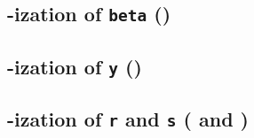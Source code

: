 \subsection{\rlp{}-ization of \texttt{beta} (\phaseBeta)}                                         \label{rlp txn v2: phase constraints: beta}           
\subsection{\rlp{}-ization of \texttt{y} (\phaseY)}                                               \label{rlp txn v2: phase constraints: y}              
\subsection{\rlp{}-ization of \texttt{r} and \texttt{s} (\phaseR{} and \phaseS)}                  \label{rlp txn v2: phase constraints: r and s}        
